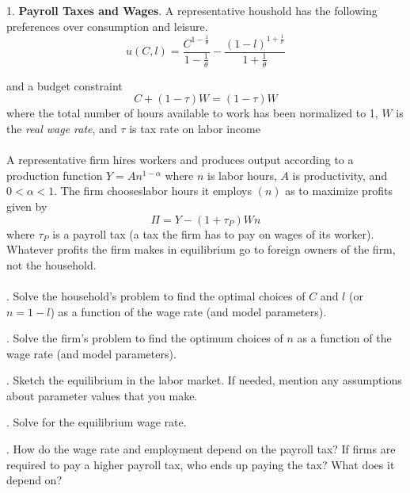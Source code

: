 \documentclass[11pt]{SelfArxOneColBMN}
\affiliation{\textsuperscript{1}\textit{John E. Walker Department of Economics,
Clemson University,Clemson, SC: email ijdavis@g.clemson.edu}}
\date{\small{Version ~\today}}
\begin{document}
\flushbottom

\maketitle

\renewcommand{\theexercise}{\arabic{exercise}}%

1. \textbf{Payroll Taxes and Wages}. A representative houshold has the following preferences over consumption and leisure.
\begin{equation}
	u(C,l) = \frac{C^{1-\frac{1}{\theta}}}{1 - \frac{1}{\theta}} - \frac{(1 - l)^{1 + \frac{1}{\nu}}}{1 + \frac{1}{\theta}}
\end{equation}

and a budget constraint
\begin{equation}
	C + (1 - \tau)W = (1 - \tau)W
\end{equation}
where the total number of hours available to work has been normalized to 1, $W$ is the \textit{real wage rate}, and $\tau$ is tax rate on labor income\\
\\
A representative firm hires workers and produces output according to a production function $Y = An^{1-\alpha}$ where $n$ is labor hours, $A$ is productivity, and $0 < \alpha < 1$. The firm chooseslabor hours it employs $(n)$ as to maximize profits given by
\begin{equation}
	\Pi = Y - (1 + \tau_P)Wn
\end{equation}
where $\tau_P$ is a payroll tax (a tax the firm has to pay on wages of its worker). Whatever profits the firm makes in equilibrium go to foreign owners of the firm, not the household.\\
\\
. Solve the household's problem to find the optimal choices of $C$ and $l$ (or $n = 1 - l$) as a function of the wage rate (and model parameters).

. Solve the firm's problem to find the optimum choices of $n$ as a function of the wage rate (and model parameters).

. Sketch the equilibrium in the labor market. If needed, mention any assumptions about parameter values that you make.

. Solve for the equilibrium wage rate.

. How do the wage rate and employment depend on the payroll tax? If firms are required to pay a higher payroll tax, who ends up paying the tax? What does it depend on?
\end{document}
